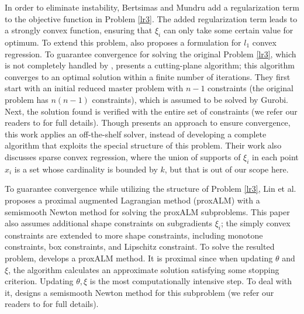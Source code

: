 \documentclass{article}
\begin{document}
In order to eliminate instability, Bertsimas and Mundru \cite{Bertsimas20} add a regularization term to the objective function in Problem \eqref{lr3}. The added regularization term leads to a strongly convex function, ensuring that $\xi_i$ can only take some certain value for optimum. To extend this problem, \cite{Bertsimas20} also proposes a formulation for $l_1$ convex regression. To guarantee convergence for solving the original Problem \eqref{lr3}, which is not completely handled by \cite{Mazumder18}, \cite{Bertsimas20} presents a cutting-plane algorithm; this algorithm converges to an optimal solution within a finite number of iterations. They first start with an initial reduced master problem with $n-1$ constraints (the original problem has $n(n-1)$ constraints), which is assumed to be solved by Gurobi. Next, the solution found is verified with the entire set of constraints (we refer our readers to \cite{Bertsimas20} for full details). Though \cite{Bertsimas20} presents an approach to ensure convergence, this work applies an off-the-shelf solver, instead of developing a complete algorithm that exploits the special structure of this problem. Their work also discusses sparse convex regression, where the union of supports of $\xi_i$ in each point $x_i$ is a set whose cardinality is bounded by $k$, but that is out of our scope here.

To guarantee convergence while utilizing the structure of Problem \eqref{lr3}, Lin et al. \cite{Lin22} proposes a proximal augmented Lagrangian method (proxALM) with a semismooth Newton method for solving the proxALM subproblems. This paper also assumes additional shape constraints on subgradients $\xi_i$; the simply convex constraints are extended to more shape constraints, including monotone constraints, box constraints, and Lipschitz constraint. To solve the resulted problem, \cite{Lin22} develops a proxALM method. It is proximal since when updating $\theta$ and $\xi$, the algorithm calculates an approximate solution satisfying some stopping criterion. Updating $\theta,\xi$ is the most computationally intensive step. To deal with it, \cite{Lin22} designs a semismooth Newton method for this subproblem (we refer our readers to \cite{Lin22} for full details). 



\end{document}
